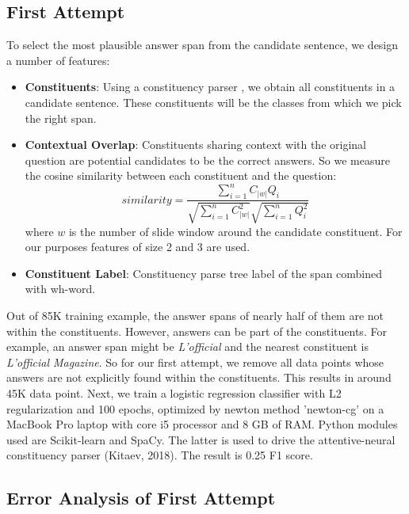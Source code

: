 \subsection{First Attempt}
To select the most plausible answer span from the candidate sentence, we design a number of features:
\begin{itemize}
\item \textbf{Constituents}: Using a constituency parser \citep{kitaev2018constituency}, we obtain all constituents in a candidate sentence. These constituents will be the classes from which we pick the right span.
\item \textbf{Contextual Overlap}: Constituents sharing context with the original question are potential candidates to be the correct answers. So we measure the cosine similarity between each constituent and the question:
$${ similarity } = \frac { \sum _ { i = 1 } ^ { n } C _ { |w| } Q _ { i } } { \sqrt { \sum _ { i = 1 } ^ { n } C _ { |w| } ^ { 2 } } \sqrt { \sum _ { i = 1 } ^ { n } Q _ { i } ^ { 2 } } }$$ 
where $w$ is the number of slide window around the candidate constituent. For our purposes features of size 2 and 3 are used. 

\item \textbf{Constituent Label}: Constituency parse tree label of the span combined with wh-word.
\end{itemize}
Out of 85K training example, the answer spans of nearly half of them are not within the constituents. However, answers can be part of the constituents.  For example, an answer span might be \textit{L'official} and the nearest constituent is \textit{L'official Magazine}. So for our first attempt, we remove all data points whose answers are not explicitly found within the constituents. This results in around 45K data point. Next, we train a logistic regression classifier with L2 regularization and 100 epochs, optimized by newton method 'newton-cg' on a MacBook Pro laptop with core i5 processor and 8 GB of RAM. Python modules used are Scikit-learn and SpaCy. The latter is used to drive the attentive-neural constituency parser (Kitaev, 2018). The result is 0.25 F1 score.




\subsection{Error Analysis of First Attempt}

